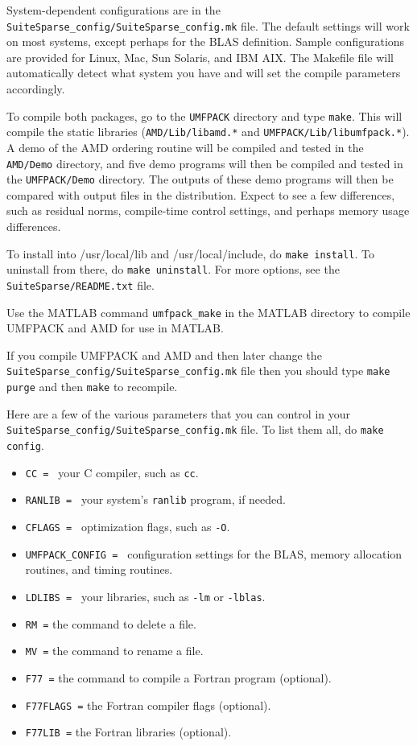\documentclass[11pt]{article}
\begin{document}
System-dependent configurations are in the {\tt SuiteSparse\_config/SuiteSparse\_config.mk}
file.  The default
settings will work on most systems, except perhaps for the BLAS definition.
Sample configurations are provided
for Linux, Mac, Sun Solaris, and IBM AIX.
The Makefile file will automatically detect what system you have
and will set the compile parameters accordingly. 

To compile both packages,
go to the {\tt UMFPACK} directory and type {\tt make}.  This will compile the
static
libraries ({\tt AMD/Lib/libamd.*} and {\tt UMFPACK/Lib/libumfpack.*}).
A demo of the AMD ordering routine will be compiled and tested in
the {\tt AMD/Demo} directory, and five demo programs will then be
compiled and tested in the {\tt UMFPACK/Demo} directory.
The outputs of these demo programs will then be compared with output
files in the distribution.  Expect to see a few differences, such as
residual norms, compile-time control settings, and perhaps memory usage
differences.

To install into /usr/local/lib and /usr/local/include,
do {\tt make install}.
To uninstall from there,
do {\tt make uninstall}.
For more options, see the {\tt SuiteSparse/README.txt} file.

Use the MATLAB command {\tt umfpack\_make} in the MATLAB directory
to compile UMFPACK and AMD for use in MATLAB.

If you compile UMFPACK and AMD and then later change the
{\tt SuiteSparse\_config/SuiteSparse\_config.mk} file
then you should type {\tt make purge} and then {\tt make} to recompile.

Here are a few of the various parameters that you can control in your
{\tt SuiteSparse\_config/SuiteSparse\_config.mk} file.
To list them all, do {\tt make config}.

\begin{itemize}
\item {\tt CC = } your C compiler, such as {\tt cc}.
\item {\tt RANLIB = } your system's {\tt ranlib} program, if needed.
\item {\tt CFLAGS = } optimization flags, such as {\tt -O}.
\item {\tt UMFPACK\_CONFIG = } configuration settings for the BLAS,
    memory allocation routines, and timing routines.
\item {\tt LDLIBS = } your libraries, such as {\tt -lm} or {\tt -lblas}.
\item {\tt RM =} the command to delete a file.
\item {\tt MV =} the command to rename a file.
\item {\tt F77 =} the command to compile a Fortran program (optional).
\item {\tt F77FLAGS =} the Fortran compiler flags (optional).
\item {\tt F77LIB =} the Fortran libraries (optional).
\end{itemize}
\end{document}
